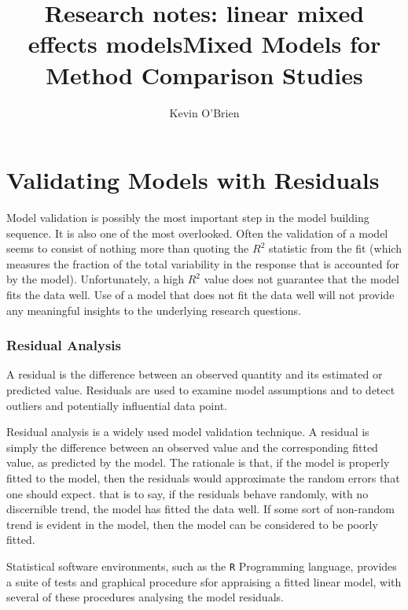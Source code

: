 \documentclass[12pt, a4paper]{report}
\title{Research notes: linear mixed effects models}
\author{ } \date{ }
\theoremstyle{plain}
\theoremstyle{definition}
\theoremstyle{remark}
\begin{document}
	\author{Kevin O'Brien}
	\title{Mixed Models for Method Comparison Studies}
	\tableofcontents
	
	\newpage
	
	\section{Validating Models with Residuals}
	Model validation is possibly the most important step in the model building sequence. It is also one of the most overlooked. Often the validation of a model seems to consist of nothing more than quoting the $R^2$ statistic from the fit (which measures the fraction of the total variability in the response that is accounted for by the model). Unfortunately, a high $R^2$ value does not guarantee that the model fits the data well. Use of a model that does not fit the data well will not provide any meaningful insights to the underlying research questions.
	
	\subsubsection{Residual Analysis}
	A residual is the difference between an observed quantity and its estimated or predicted value. Residuals are used to examine model assumptions and to detect outliers and potentially influential data	point. 
	
	Residual analysis is a widely used model validation technique. A residual is simply the difference between an observed value and the corresponding fitted value, as predicted by the model. The rationale is that, if the model is properly fitted to the model, then the residuals would approximate the random errors that one should expect.
	that is to say, if the residuals behave randomly, with no discernible trend, the model has fitted the data well. If some sort of non-random trend is evident in the model, then the model can be considered to be poorly fitted.
		
			Statistical software environments, such as the \texttt{R} Programming language, provides a suite of tests and graphical procedure sfor appraising a fitted linear model, with several 
			of these procedures analysing the model residuals.
			
\end{document}
